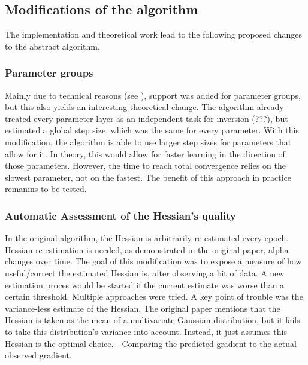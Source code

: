 \documentclass[twoside,12pt,a4paper]{report}
\begin{document}
\subsection{Modifications of the algorithm}
The implementation and theoretical work lead to the following proposed changes to the abstract algorithm.
\subsubsection{Parameter groups}
Mainly due to technical reasons (see ), support was added for parameter groups, but this also yields an interesting theoretical change. The algorithm already treated every parameter layer as an independent task for inversion (???), but estimated a global step size, which was the same for every parameter. With this modification, the algorithm is able to use larger step sizes for parameters that allow for it. In theory, this would allow for faster learning in the direction of those parameters. However, the time to reach total convergence relies on the slowest parameter, not on the fastest. The benefit of this approach in practice remanins to be tested.

\subsubsection{Automatic Assessment of the Hessian's quality}
In the original algorithm, the Hessian is arbitrarily re-estimated every epoch. Hessian re-estimation is needed, as demonstrated in the original paper, alpha changes over time. The goal of this modification was to expose a measure of how useful/correct the estimated Hessian is, after observing a bit of data. A new estimation proces would be started if the current estimate was worse than a certain threshold. Multiple approaches were tried. A key point of trouble was the variance-less estimate of the Hessian. The original paper mentions that the Hessian is taken as the mean of a multivariate Gaussian distribution, but it fails to take this distribution's variance into account. Instead, it just assumes this Hessian is the optimal choice. 
- Comparing the predicted gradient to the actual observed gradient.
\end{document}
